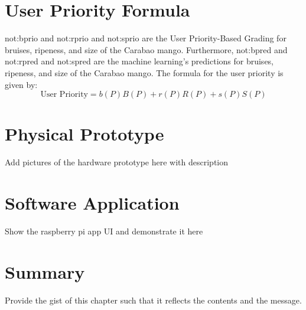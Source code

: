 \section{User Priority Formula} \label{sec:userPriorityFormula}
\gls{not:bprio} and \gls{not:rprio} and \gls{not:sprio} are the \gls{User Priority-Based Grading} for bruises, ripeness, and size of the Carabao mango. 
Furthermore, \gls{not:bpred} and \gls{not:rpred} and \gls{not:spred} are the machine learning's predictions for bruises, ripeness, and size of the Carabao mango.
The formula for the user priority is given by:
\begin{equation}
	\label{eq:userPriority}
	\text{User Priority} = \ensuremath{b \left( P \right)  B\left( P \right) + r \left( P \right) R\left( P \right) + s \left( P \right) S\left( P \right)}
\end{equation}


\section{Physical Prototype} \label{sec:physicalPrototype}

Add pictures of the hardware prototype here with description

\section{Software Application}

Show the raspberry pi app UI and demonstrate it here 

\section{Summary} \label{sec:summary_results_and_discussions}

Provide the gist of this chapter such that it reflects the contents and the message.